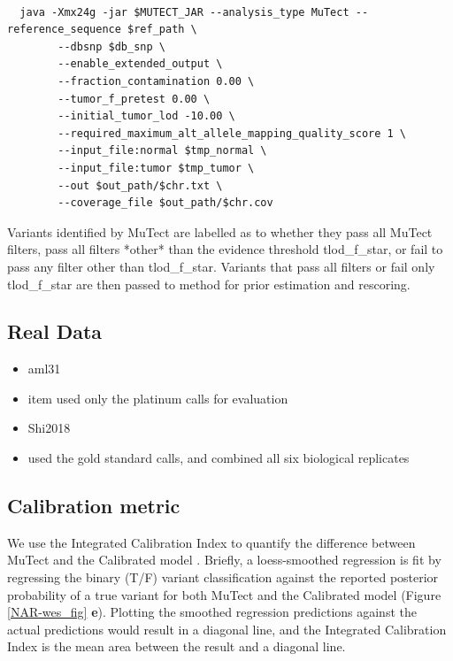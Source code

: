 \documentclass[a4,center,fleqn]{NAR}
\begin{document}
\begin{tiny}
\begin{verbatim}

  java -Xmx24g -jar $MUTECT_JAR --analysis_type MuTect --reference_sequence $ref_path \
        --dbsnp $db_snp \
        --enable_extended_output \
        --fraction_contamination 0.00 \
        --tumor_f_pretest 0.00 \
        --initial_tumor_lod -10.00 \
        --required_maximum_alt_allele_mapping_quality_score 1 \
        --input_file:normal $tmp_normal \
        --input_file:tumor $tmp_tumor \
        --out $out_path/$chr.txt \
        --coverage_file $out_path/$chr.cov

\end{verbatim}
\end{tiny}
Variants identified by MuTect are labelled as to whether they pass all MuTect filters, pass all filters *other* than the evidence threshold \textrm{tlod\_f\_star}, or fail to pass any filter other than \textrm{tlod\_f\_star}. Variants that pass all filters or fail only \textrm{tlod\_f\_star} are then passed to {method} for prior estimation and rescoring.

\subsection{Real Data}
\begin{itemize}
  \item aml31 \cite{Griffith2015}
  \item item used only the platinum calls for evaluation
  \item Shi2018 \cite{Shi2018}
  \item used the gold standard calls, and combined all six biological replicates 
\end{itemize}

\subsection{Calibration metric}

	We use the Integrated Calibration Index to quantify the difference between MuTect and the Calibrated model \cite{Austin2019}.
	Briefly, a loess-smoothed regression is fit by regressing the binary (T/F) variant classification against the reported posterior probability of a true variant for both MuTect and the Calibrated model (Figure \ref{NAR-wes_fig} \textbf{e}).
	Plotting the smoothed regression predictions against the actual predictions would result in a diagonal line, and the Integrated Calibration Index is the mean area between the result and a diagonal line.
\end{document}
